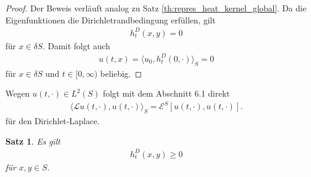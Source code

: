 \documentclass[headsepline,11pt]{scrbook}
\newtheorem{thm}[lem]{Satz}
\theoremstyle{definition}
\begin{document}
\begin{proof}
	Der Beweis verl\"auft analog zu Satz \ref{th:repres_heat_kernel_global}.
	Da die Eigenfunktionen die Dirichletrandbedingung erf\"ullen, gilt 
	\begin{align*}
	h_t^D(x,y) = 0
	\end{align*}
	f\"ur $ x \in \delta S$.  
	Damit folgt auch
	\begin{align}
	u(t,x) = \langle u_0, h_t^D(0,\cdot) \rangle_S  = 0
	\end{align}
	f\"ur $ x \in \delta S $ und $ t \in [0,\infty) $ beliebig.
\end{proof}

Wegen $ u(t,\cdot ) \in L^2(S) $ folgt mit dem Abschnitt 6.1  direkt
\begin{align}
\langle \mathcal{ L }u(t,\cdot) , u(t,\cdot ) \rangle_S
=
\mathcal{E}^S[u(t ,\cdot),u(t,\cdot)]. 
\end{align}
f\"ur den Dirichlet-Laplace.  


\begin{thm}\label{th:positivity_heat_kernel_dirichlet}
	Es gilt 
	\begin{align}
	h_t^D(x,y) \geq 0
	\end{align}
	f\"ur $ x,y \in S $.
\end{thm}
\end{document}
